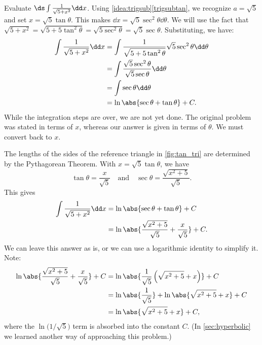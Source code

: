 \begin{example}\label{ex_trigsub3}
Evaluate $\ds \int \frac{1}{\sqrt{5+x^2}}\dd x$.
\solution
Using \autoref{idea:trigsub}\ref*{trigsubtan}, we recognize $a=\sqrt{5}$ and  set $x= \sqrt{5}\tan \theta$. This makes $\dd x = \sqrt{5}\sec^2\theta\dd\theta$. We will use the fact that $\sqrt{5+x^2} = \sqrt{5+5\tan^2\theta} = \sqrt{5\sec^2\theta} = \sqrt{5}\sec\theta.$ Substituting, we have:
\begin{align*}
\int \frac{1}{\sqrt{5+x^2}}\dd x &= \int \frac{1}{\sqrt{5+5\tan^2\theta}}\sqrt{5}\sec^2\theta\dd\theta \\
			&= \int \frac{\sqrt{5}\sec^2\theta}{\sqrt{5}\sec\theta} \dd\theta\\
			&= \int \sec\theta\dd\theta\\
			&= \ln\abs{\sec\theta+\tan\theta}+C.
\end{align*}
While the integration steps are over, we are not yet done. The original problem was stated in terms of $x$, whereas our answer is given in terms of $\theta$. We must convert back to $x$.

The lengths of the sides of the reference triangle in \autoref{fig:tan_tri} are determined by the Pythagorean Theorem. With $x=\sqrt{5}\tan\theta$, we have 
\[\tan \theta = \frac x{\sqrt{5}}\quad \text{and}\quad \sec\theta = \frac{\sqrt{x^2+5}}{\sqrt{5}}.\]
This gives\vspace{-.3\baselineskip}
\begin{align*}
	\int\frac1{\sqrt{5+x^2}}\dd x
	&= \ln\abs{\sec\theta+\tan\theta}+C \\
	&= \ln\abs{\frac{\sqrt{x^2+5}}{\sqrt5}+ \frac x{\sqrt5}}+C.
\end{align*}
We can leave this answer as is, or we can use a logarithmic identity to simplify it. Note:\vspace{-.3\baselineskip}
\begin{align*}
	\ln\abs{\frac{\sqrt{x^2+5}}{\sqrt5}+ \frac x{\sqrt5}}+C
	&= \ln\abs{\frac1{\sqrt5}\left(\sqrt{x^2+5}+ x\right)}+C \\
	&= \ln\abs{\frac1{\sqrt5}} + \ln\abs{\sqrt{x^2+5}+ x}+C\\
	&=	\ln\abs{\sqrt{x^2+5}+ x}+C,
\end{align*}
where the $\ln\bigl(1/\sqrt5\bigr)$ term is absorbed into the constant $C$. (In \autoref{sec:hyperbolic} we learned another way of approaching this problem.)
\end{example}

